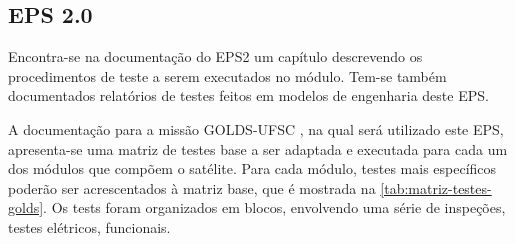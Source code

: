 \subsection{EPS 2.0}

Encontra-se na documentação do \gls{EPS2} \cite{eps2-doc} um capítulo descrevendo os procedimentos de teste a serem executados no módulo.
Tem-se também documentados relatórios de testes feitos em modelos de engenharia deste \gls{EPS}.

A documentação para a missão GOLDS-UFSC \cite{golds-ufsc-doc}, na qual será utilizado este \gls{EPS}, apresenta-se uma matriz de testes base a ser adaptada e executada para cada um dos módulos que compõem o satélite.
Para cada módulo, testes mais específicos poderão ser acrescentados à matriz base, que é mostrada na \autoref{tab:matriz-testes-golds}.
Os tests foram organizados em blocos, envolvendo uma série de inspeções, testes elétricos, funcionais.

